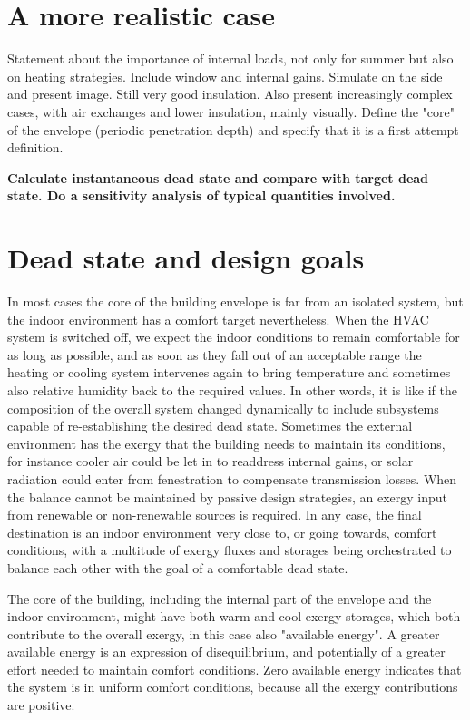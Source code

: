 \documentclass[10pt]{extarticle} %
\begin{document}
\vskip3cm


\vfill \break


\section{A more realistic case} \label{subsec:moreComplex}

Statement about the importance of internal loads, not only for summer but also on heating strategies. 
Include window and internal gains. Simulate on the side and present image. Still very good insulation.
Also present increasingly complex cases, with air exchanges and lower insulation, mainly visually.
Define the "core" of the envelope (periodic penetration depth) and specify that it is a first attempt definition.

{\bf Calculate instantaneous dead state and compare with target dead state. Do a sensitivity analysis of typical quantities involved.}

\vskip3cm


\section{Dead state and design goals}

In most cases the core of the building envelope is far from an isolated system, but the indoor environment has a comfort target nevertheless. When the HVAC system is switched off, we expect the indoor conditions to remain comfortable for as long as possible, and as soon as they fall out of an acceptable range the heating or cooling system intervenes again to bring temperature and sometimes also relative humidity back to the required values. In other words, it is like if the composition of the overall system changed dynamically to include subsystems capable of re-establishing the desired dead state. Sometimes the external environment has the exergy that the building needs to maintain its conditions, for instance cooler air could be let in to readdress internal gains, or solar radiation could enter from fenestration to compensate transmission losses. When the balance cannot be maintained by passive design strategies, an exergy input from renewable or non-renewable sources is required. In any case, the final destination is an indoor environment very close to, or going towards, comfort conditions, with a multitude of exergy fluxes and storages being orchestrated to balance each other with the goal of a comfortable dead state.

The core of the building, including the internal part of the envelope and the indoor environment, might have both warm and cool exergy storages, which both contribute to the overall exergy, in this case also "available energy". A greater available energy is an expression of disequilibrium, and potentially of a greater effort needed to maintain comfort conditions. Zero available energy indicates that the system is in uniform comfort conditions, because all the exergy contributions are positive.
\end{document}
